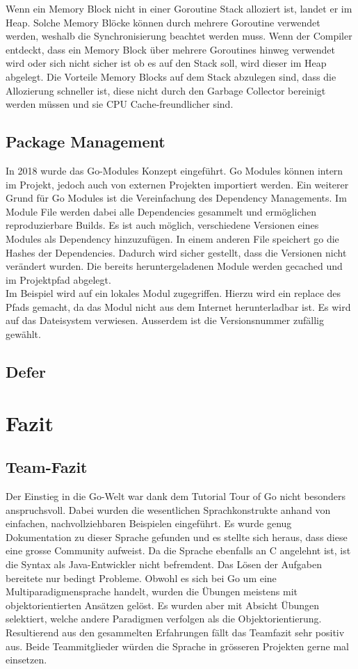 \documentclass[12pt,titlepage]{article}
\begin{document}
Wenn ein Memory Block nicht in einer Goroutine Stack alloziert ist, landet er im Heap.
Solche Memory Blöcke können durch mehrere Goroutine verwendet werden, weshalb die Synchronisierung beachtet werden muss.
Wenn der Compiler entdeckt, dass ein Memory Block über mehrere Goroutines hinweg verwendet wird oder sich nicht sicher ist ob es auf den Stack soll, wird dieser im Heap abgelegt.
Die Vorteile Memory Blocks auf dem Stack abzulegen sind, dass die Allozierung schneller ist, diese nicht durch den Garbage Collector bereinigt werden müssen und sie CPU Cache-freundlicher sind.

\subsection{Package Management}
In 2018 wurde das Go-Modules Konzept eingeführt. Go Modules können intern im Projekt, jedoch auch von externen Projekten importiert werden. Ein weiterer Grund für Go Modules ist die Vereinfachung des Dependency Managements. Im Module File werden dabei alle Dependencies gesammelt und ermöglichen reproduzierbare Builds. Es ist auch möglich, verschiedene Versionen eines Modules als Dependency hinzuzufügen. In einem anderen File speichert go die Hashes der Dependencies. Dadurch wird sicher gestellt, dass die Versionen nicht verändert wurden. Die bereits heruntergeladenen Module werden gecached und im Projektpfad abgelegt. \\
Im Beispiel wird auf ein lokales Modul zugegriffen. Hierzu wird ein replace des Pfads gemacht, da das Modul nicht aus dem Internet herunterladbar ist. Es wird auf das Dateisystem verwiesen. Ausserdem ist die Versionsnummer zufällig gewählt. 

\subsection{Defer}


\section{Fazit}
\subsection{Team-Fazit}
Der Einstieg in die Go-Welt war dank dem Tutorial \glqq Tour of Go\grqq{} nicht besonders anspruchsvoll.
Dabei wurden die wesentlichen Sprachkonstrukte anhand von einfachen, nachvollziehbaren Beispielen eingeführt.
Es wurde genug Dokumentation zu dieser Sprache gefunden und es stellte sich heraus, dass diese eine grosse Community aufweist.
Da die Sprache ebenfalls an C angelehnt ist, ist die Syntax als Java-Entwickler nicht befremdent.
Das Lösen der Aufgaben bereitete nur bedingt Probleme.
Obwohl es sich bei Go um eine Multiparadigmensprache handelt, wurden die Übungen meistens mit objektorientierten Ansätzen gelöst.
Es wurden aber mit Absicht Übungen selektiert, welche andere Paradigmen verfolgen als die Objektorientierung. \\
Resultierend aus den gesammelten Erfahrungen fällt das Teamfazit sehr positiv aus.
Beide Teammitglieder würden die Sprache in grösseren Projekten gerne mal einsetzen.
\end{document}
